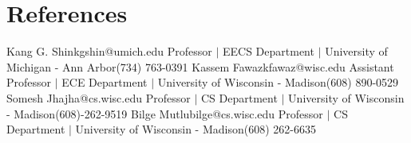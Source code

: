 \section{References}
  \CVSubHeadingListStart
    \CVSubheading
      {Kang G. Shin}{kgshin@umich.edu}
      {Professor $|$ EECS Department $|$ University of Michigan - Ann Arbor}{(734) 763-0391}
    \CVSubheading
      {Kassem Fawaz}{kfawaz@wisc.edu}
      {Assistant Professor $|$ ECE Department $|$ University of Wisconsin - Madison}{(608) 890-0529}
    \CVSubheading
      {Somesh Jha}{jha@cs.wisc.edu}
      {Professor $|$ CS Department $|$ University of Wisconsin - Madison}{(608)-262-9519}
    \CVSubheading
      {Bilge Mutlu}{bilge@cs.wisc.edu}
      {Professor $|$ CS Department $|$ University of Wisconsin - Madison}{(608) 262-6635}
  \CVSubHeadingListEnd
